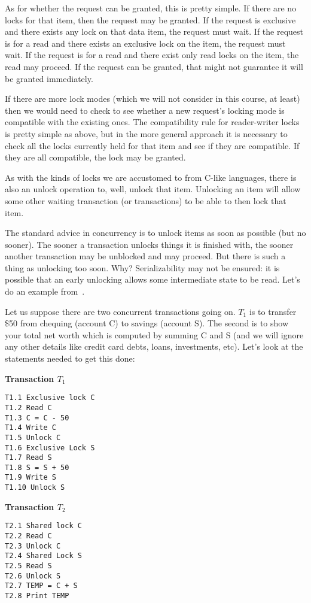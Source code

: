 \documentclass[a4paper]{report}
\begin{document}
As for whether the request can be granted, this is pretty simple. If there are no locks for that item, then the request may be granted. If the request is exclusive and there exists any lock on that data item, the request must wait. If the request is for a read and there exists an exclusive lock on the item, the request must wait. If the request is for a read and there exist only read locks on the item, the read may proceed. If the request can be granted, that might not guarantee it will be granted immediately.

If there are more lock modes (which we will not consider in this course, at least) then we would need to check to see whether a new request's locking mode is compatible with the existing ones. The compatibility rule for reader-writer locks is pretty simple as above, but in the more general approach it is necessary to check all the locks currently held for that item and see if they are compatible. If they are all compatible, the lock may be granted.

As with the kinds of locks we are accustomed to from C-like languages, there is also an unlock operation to, well, unlock that item. Unlocking an item will allow some other waiting transaction (or transactions) to be able to then lock that item.

The standard advice in concurrency is to unlock items as soon as possible (but no sooner). The sooner a transaction unlocks things it is finished with, the sooner another transaction may be unblocked and may proceed. But there is such a thing as unlocking too soon. Why? Serializability may not be ensured: it is possible that an early unlocking allows some intermediate state to be read. Let's do an example from~\cite{dsc}.

Let us suppose there are two concurrent transactions going on. $T_{1}$ is to transfer \$50 from chequing (account C) to savings (account S). The second is to show your total net worth which is computed by summing C and S (and we will ignore any other details like credit card debts, loans, investments, etc). Let's look at the statements needed to get this done:

\begin{multicols}{2}
\textbf{Transaction $T_{1}$}
\begin{verbatim}
T1.1 Exclusive lock C
T1.2 Read C
T1.3 C = C - 50
T1.4 Write C
T1.5 Unlock C
T1.6 Exclusive Lock S
T1.7 Read S
T1.8 S = S + 50
T1.9 Write S
T1.10 Unlock S
\end{verbatim}

\columnbreak
\textbf{Transaction $T_{2}$}
\begin{verbatim}
T2.1 Shared lock C
T2.2 Read C
T2.3 Unlock C
T2.4 Shared Lock S
T2.5 Read S
T2.6 Unlock S
T2.7 TEMP = C + S
T2.8 Print TEMP


\end{verbatim}
\end{multicols}
\end{document}
